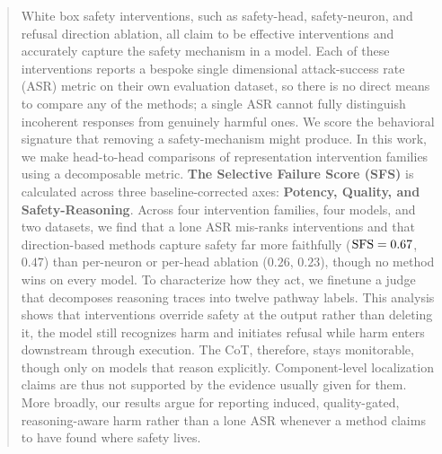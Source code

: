 \begin{abstract}
White box safety interventions, such as safety-head, safety-neuron, and refusal direction ablation, all claim to be effective interventions and accurately capture the safety mechanism in a model. Each of these interventions reports a bespoke single dimensional attack-success rate (ASR) metric on their own evaluation dataset, so there is no direct means to compare any of the methods; a single ASR cannot fully distinguish incoherent responses from genuinely harmful ones. We score the behavioral signature that removing a safety-mechanism might produce. In this work, we make head-to-head comparisons of representation intervention families using a decomposable metric. \textbf{The Selective Failure Score (SFS)} is calculated across three baseline-corrected axes: \textbf{Potency, Quality, and Safety-Reasoning}. Across four intervention families, four models, and two datasets, we find that a lone ASR mis-ranks interventions and that direction-based methods capture safety far more faithfully ($\SFS=0.67$, $0.47$) than per-neuron or per-head ablation ($0.26$, $0.23$), though no method wins on every model. To characterize how they act, we finetune a judge that decomposes reasoning traces into twelve pathway labels. This analysis shows that interventions override safety at the output rather than deleting it, the model still recognizes harm and initiates refusal while harm enters downstream through execution. The CoT, therefore, stays monitorable, though only on models that reason explicitly. Component-level localization claims are thus not supported by the evidence usually given for them. More broadly, our results argue for reporting induced, quality-gated, reasoning-aware harm rather than a lone ASR whenever a method claims to have found where safety lives. 




\end{abstract}
